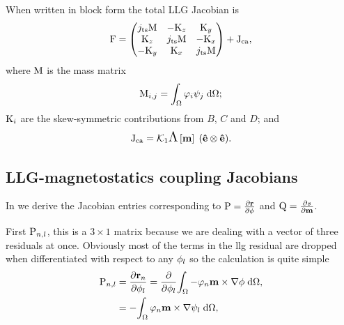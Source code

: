 When written in block form the total LLG Jacobian is
\begin{equation}
  \mathrm{F} =
  \begin{pmatrix}
    j_\mathrm{ts} \mathrm{M}    & -\mathrm{K}_z       & \mathrm{K}_y \\
    \mathrm{K}_z         & j_\mathrm{ts}\mathrm{M}    & -\mathrm{K}_x \\
    -\mathrm{K}_y        & \mathrm{K}_x        & j_\mathrm{ts} \mathrm{M}
  \end{pmatrix} + \mathrm{J}_\mathrm{ca},
  \label{eq:llg-jacobian}
\end{equation}
where $\mathrm{M}$ is the mass matrix
\begin{equation}
  \label{eq:mass-matrix}
  \mathrm{M}_{i,j} = {\int_{\Omega} {\varphi_i \psi_j} {\; \mathrm{{d}}} {\Omega}};
\end{equation}
$\mathrm{K}_i$ are the skew-symmetric contributions from $B$, $C$ and $D$; and
\begin{equation}
  \mathrm{J}_\mathrm{ca} = \mathcal{K}_1 \text{\Large{$\Lambda$}}\left[ \mathbf{m} \right] \; (\mathbf{\hat{e}}  \otimes \mathbf{\hat{e}}).
\end{equation}

\subsection{LLG-magnetostatics coupling Jacobians}
\label{sec:llg-magn-coupl}

In  we derive the Jacobian entries corresponding to $\mathrm{P} = \frac{\partial \mathbf{r}}{\partial \phi}$ and $\mathrm{Q} = \frac{\partial s}{\partial \mathbf{m}}$.

First $\mathrm{P}_{n,l}$, this is a $3 \times 1$ matrix because we are dealing with a vector of three residuals at once.
Obviously most of the terms in the llg residual are dropped when differentiated with respect to any $\phi_{l}$ so the calculation is quite simple
\begin{equation}
  \begin{aligned}
    \mathrm{P}_{n,l} &= \frac{\partial \mathbf{r}_n}{\partial \phi_l} 
    = \frac{\partial }{\partial \phi_l} {\int_{\Omega} { -\varphi_n \mathbf{m} \times \nabla \phi} {\; \mathrm{{d}}} {\Omega}}, \\
    &= -{\int_{\Omega} { \varphi_n \mathbf{m} \times \nabla \psi_l} {\; \mathrm{{d}}} {\Omega}}, \\
  \end{aligned}
\end{equation}

